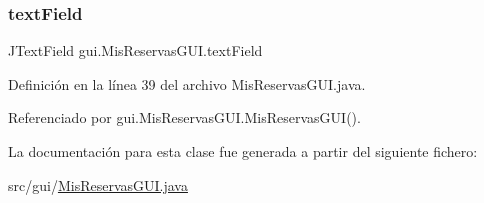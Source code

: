 \subsubsection{\texorpdfstring{textField}{textField}}
{\footnotesize\ttfamily J\+Text\+Field gui.\+Mis\+Reservas\+G\+U\+I.\+text\+Field\hspace{0.3cm}{\ttfamily [private]}}



Definición en la línea 39 del archivo Mis\+Reservas\+G\+U\+I.\+java.



Referenciado por gui.\+Mis\+Reservas\+G\+U\+I.\+Mis\+Reservas\+G\+U\+I().



La documentación para esta clase fue generada a partir del siguiente fichero\+:\begin{DoxyCompactItemize}
\item 
src/gui/\mbox{\hyperlink{_mis_reservas_g_u_i_8java}{Mis\+Reservas\+G\+U\+I.\+java}}\end{DoxyCompactItemize}
